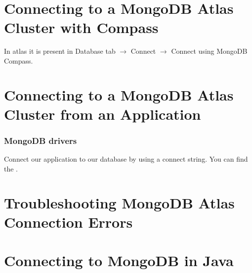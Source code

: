 \documentclass[../main.tex]{subfiles}
\begin{document}
\section{Connecting to a MongoDB Atlas Cluster with Compass}
In atlas it is present in Database tab $\rightarrow$ Connect $\rightarrow$ Connect using MongoDB Compass.

\section{Connecting to a MongoDB Atlas Cluster from an Application}
\subsubsection{MongoDB drivers} 
Connect our application to our database by using a connect string.
You can find the \href{mongodb.com/docs/drivers}{\color{blue}{mongodb drivers list here}}.

\section{Troubleshooting MongoDB Atlas Connection Errors}
\section{Connecting to MongoDB in Java}


\printglossaries
\end{document}

